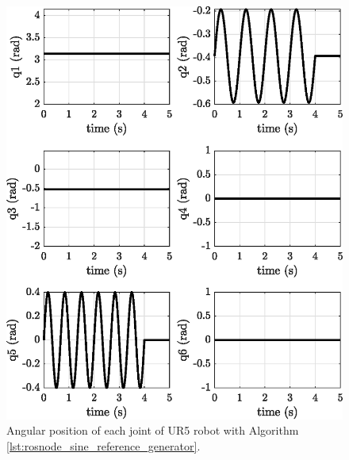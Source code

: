 \begin{figure}[H]
    \centering
    \includegraphics{images/act_1.1/joint_position.eps}
    \caption{Angular position of each joint of UR5 robot with Algorithm \ref{lst:rosnode_sine_reference_generator}.}
    \label{fig:act_1.1_joint_position}
\end{figure}

